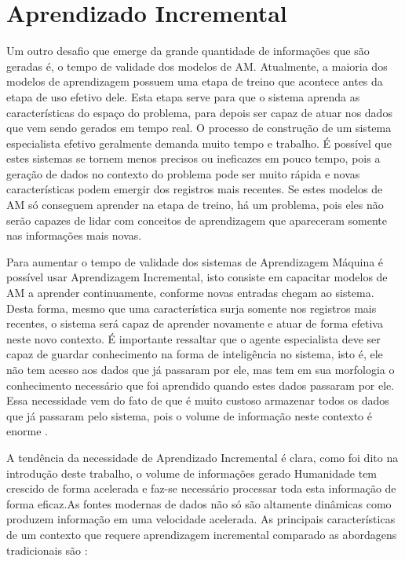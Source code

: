 \chapter{Aprendizado Incremental}


Um outro desafio que emerge da grande quantidade de informações que são geradas é, o tempo de validade dos modelos de AM. Atualmente, a maioria dos modelos de aprendizagem possuem uma etapa de treino que acontece antes da etapa de uso efetivo dele. Esta etapa serve para que o sistema aprenda as características do espaço do problema, para depois ser capaz de atuar nos dados que vem sendo gerados em tempo real. 
O processo de construção de um sistema especialista efetivo geralmente demanda muito tempo e trabalho. É possível que estes sistemas se tornem menos precisos ou ineficazes em pouco tempo, pois a geração de dados no contexto do problema pode ser muito rápida e novas características podem emergir dos registros mais recentes. Se estes modelos de AM só conseguem aprender na etapa de treino, há um problema, pois eles não serão capazes de lidar com conceitos de aprendizagem que apareceram somente nas informações mais novas. 

Para aumentar o tempo de validade dos sistemas de Aprendizagem Máquina é possível usar Aprendizagem Incremental, isto consiste em capacitar modelos de AM a aprender continuamente, conforme novas entradas chegam ao sistema. Desta forma, mesmo que uma característica surja somente nos registros mais recentes, o sistema será capaz de aprender novamente e atuar de forma efetiva neste novo contexto. É importante ressaltar que o agente especialista deve ser capaz de guardar conhecimento na forma de inteligência no sistema, isto é, ele não tem acesso aos dados que já passaram por ele, mas tem em sua morfologia o conhecimento necessário que foi aprendido quando estes dados passaram por ele. Essa necessidade vem do fato de que é muito custoso armazenar todos os dados que já passaram pelo sistema, pois o volume de informação neste contexto é enorme \cite{incremental2011}.

A tendência da necessidade de Aprendizado Incremental é clara, como foi dito na introdução deste trabalho, o volume de informações gerado Humanidade tem crescido de forma acelerada e faz-se necessário processar toda esta informação de forma eficaz.As fontes modernas de dados não só são altamente dinâmicas como produzem informação em uma velocidade acelerada. As principais características de um contexto que requere aprendizagem incremental comparado as abordagens tradicionais são \cite{batch2013}:

